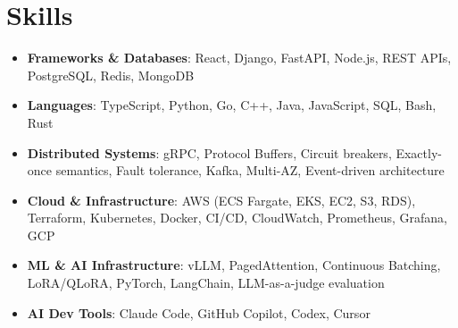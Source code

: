 \documentclass[letterpaper,11pt]{article}
\newcommand{\resumeSubHeadingListStart}{\begin{itemize}[leftmargin=0.15in, label={}]}
\newcommand{\resumeSubHeadingListEnd}{\end{itemize}}
\newcommand{\resumeSkillHeading}[2]{%
  \item\small{\textbf{#1}: #2 \vspace{-9pt}}%
}
\begin{document}
\section{Skills}
  \resumeSubHeadingListStart
    \resumeSkillHeading{Frameworks \& Databases}{React, Django, FastAPI, Node.js, REST APIs, PostgreSQL, Redis, MongoDB}
    \resumeSkillHeading{Languages}{TypeScript, Python, Go, C++, Java, JavaScript, SQL, Bash, Rust}
    \resumeSkillHeading{Distributed Systems}{gRPC, Protocol Buffers, Circuit breakers, Exactly-once semantics, Fault tolerance, Kafka, Multi-AZ, Event-driven architecture}
    \resumeSkillHeading{Cloud \& Infrastructure}{AWS (ECS Fargate, EKS, EC2, S3, RDS), Terraform, Kubernetes, Docker, CI/CD, CloudWatch, Prometheus, Grafana, GCP}
    \resumeSkillHeading{ML \& AI Infrastructure}{vLLM, PagedAttention, Continuous Batching, LoRA/QLoRA, PyTorch, LangChain, LLM-as-a-judge evaluation}
    \resumeSkillHeading{AI Dev Tools}{Claude Code, GitHub Copilot, Codex, Cursor}
  \resumeSubHeadingListEnd
\end{document}

